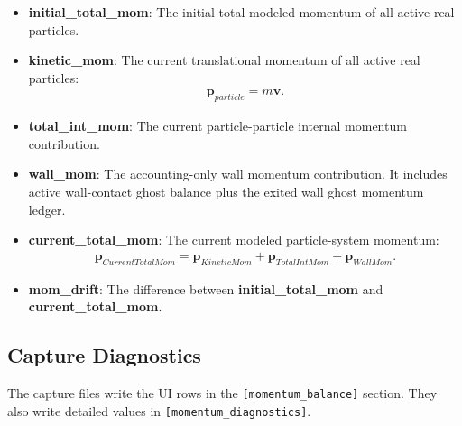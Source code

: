 \begin{itemize}
\item \textbf{initial\_total\_mom}: The initial total modeled momentum of all
active real particles.

\item \textbf{kinetic\_mom}: The current translational momentum of all active
real particles:
\begin{equation}
\begin{aligned}
\mathbf{p}_{particle} = m\mathbf{v}.
\end{aligned}
\end{equation}

\item \textbf{total\_int\_mom}: The current particle-particle internal
momentum contribution.

\item \textbf{wall\_mom}: The accounting-only wall momentum contribution.  It
includes active wall-contact ghost balance plus the exited wall ghost momentum
ledger.

\item \textbf{current\_total\_mom}: The current modeled particle-system
momentum:
\begin{equation}
\begin{aligned}
\mathbf{p}_{CurrentTotalMom}
=
\mathbf{p}_{KineticMom}
+
\mathbf{p}_{TotalIntMom}
+
\mathbf{p}_{WallMom}.
\end{aligned}
\end{equation}

\item \textbf{mom\_drift}: The difference between
\textbf{initial\_total\_mom} and \textbf{current\_total\_mom}.
\end{itemize}

\subsection{Capture Diagnostics}

The capture files write the UI rows in the \texttt{[momentum\_balance]}
section.  They also write detailed values in \texttt{[momentum\_diagnostics]}.


